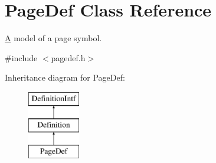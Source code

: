 \hypertarget{class_page_def}{}\section{Page\+Def Class Reference}
\label{class_page_def}


\mbox{\hyperlink{class_a}{A}} model of a page symbol.  




{\ttfamily \#include $<$pagedef.\+h$>$}

Inheritance diagram for Page\+Def\+:\begin{figure}[H]
\begin{center}
\leavevmode
\includegraphics[height=3.000000cm]{class_page_def}
\end{center}
\end{figure}
